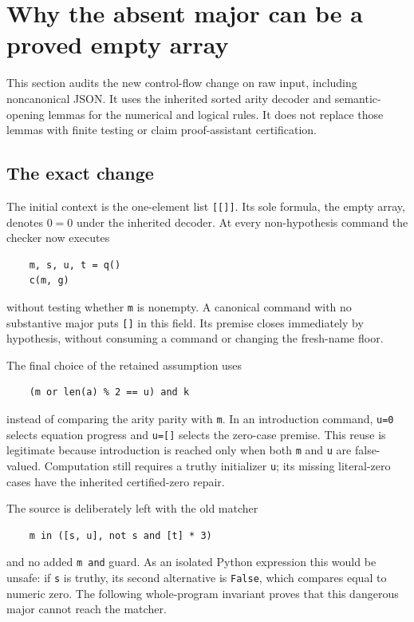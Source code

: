 
\section{Why the absent major can be a proved empty array}
\label{sec:neutral-major-audit}

This section audits the new control-flow change on raw input, including
noncanonical JSON.  It uses the inherited sorted arity decoder and
semantic-opening lemmas for the numerical and logical rules.  It does not
replace those lemmas with finite testing or claim proof-assistant
certification.

\subsection{The exact change}

The initial context is the one-element list \texttt{[[]]}.  Its sole
formula, the empty array, denotes $0=0$ under the inherited decoder.
At every non-hypothesis command the checker now executes
\begin{verbatim}
    m, s, u, t = q()
    c(m, g)
\end{verbatim}
without testing whether \texttt{m} is nonempty.  A canonical command with
no substantive major puts \texttt{[]} in this field.  Its premise closes
immediately by hypothesis, without consuming a command or changing the
fresh-name floor.

The final choice of the retained assumption uses
\begin{verbatim}
    (m or len(a) % 2 == u) and k
\end{verbatim}
instead of comparing the arity parity with \texttt{m}.  In an
introduction command, \texttt{u=0} selects equation progress and
\texttt{u=[]} selects the zero-case premise.  This reuse is legitimate
because introduction is reached only when both \texttt{m} and
\texttt{u} are false-valued.  Computation still requires a truthy
initializer \texttt{u}; its missing literal-zero cases have the
inherited certified-zero repair.

The source is deliberately left with the old matcher
\begin{verbatim}
    m in ([s, u], not s and [t] * 3)
\end{verbatim}
and no added \texttt{m and} guard.  As an isolated Python expression this
would be unsafe: if \texttt{s} is truthy, its second alternative is
\texttt{False}, which compares equal to numeric zero.  The following
whole-program invariant proves that this dangerous major cannot reach
the matcher.

